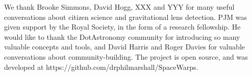 We thank Brooke Simmons, David Hogg, XXX and YYY for many useful
conversations about citizen science and gravitational lens detection.
%
PJM was given support by the Royal  Society, in the form of a research
fellowship. He would like to thank the DotAstronomy community for
introducing so many valuable concepts and tools, and David Harris and
Roger Davies for valuable conversations about community-building.
%
%
%
%
The \sw project is open source, and was developed at
https://github.com/drphilmarshall/SpaceWarps.
